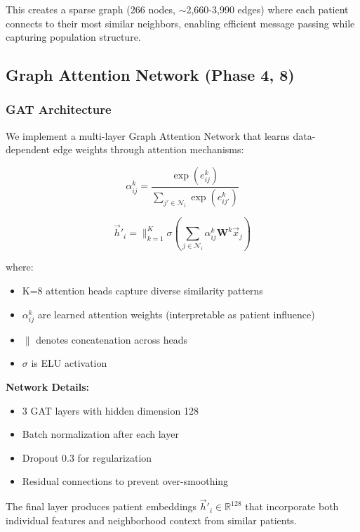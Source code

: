 \documentclass[conference]{IEEEtran}
\begin{document}
This creates a sparse graph (266 nodes, $\sim$2,660-3,990 edges) where each patient connects to their most similar neighbors, enabling efficient message passing while capturing population structure.

\subsection{Graph Attention Network (Phase 4, 8)}

\subsubsection{GAT Architecture}

We implement a multi-layer Graph Attention Network \cite{velickovic2018graph} that learns data-dependent edge weights through attention mechanisms:

\begin{equation}
\alpha_{ij}^k = \frac{\exp(e_{ij}^k)}{\sum_{j' \in \mathcal{N}_i} \exp(e_{ij'}^k)}
\end{equation}

\begin{equation}
\vec{h}'_i = \|_{k=1}^K \sigma\left(\sum_{j \in \mathcal{N}_i} \alpha_{ij}^k \mathbf{W}^k\vec{x}_j\right)
\end{equation}

where:
\begin{itemize}
\item K=8 attention heads capture diverse similarity patterns
\item $\alpha_{ij}^k$ are learned attention weights (interpretable as patient influence)
\item $\|$ denotes concatenation across heads
\item $\sigma$ is ELU activation
\end{itemize}

\textbf{Network Details:}
\begin{itemize}
\item 3 GAT layers with hidden dimension 128
\item Batch normalization after each layer
\item Dropout 0.3 for regularization
\item Residual connections to prevent over-smoothing
\end{itemize}

The final layer produces patient embeddings $\vec{h}'_i \in \mathbb{R}^{128}$ that incorporate both individual features and neighborhood context from similar patients.
\end{document}

